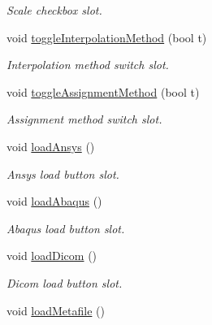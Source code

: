 \begin{DoxyCompactItemize}
\begin{DoxyCompactList}\small\item\em Scale checkbox slot. \item\end{DoxyCompactList}\item 
void \hyperlink{classgui_1_1_main_window_a9d49a35ea4419d69f2f89950a8ffbdda}{toggleInterpolationMethod} (bool t)
\begin{DoxyCompactList}\small\item\em Interpolation method switch slot. \item\end{DoxyCompactList}\item 
void \hyperlink{classgui_1_1_main_window_a3891bbf7215a4c190a6c5392dadb0a29}{toggleAssignmentMethod} (bool t)
\begin{DoxyCompactList}\small\item\em Assignment method switch slot. \item\end{DoxyCompactList}\item 
\hypertarget{classgui_1_1_main_window_ab527d189efca4163ee27ae1ffbf12f94}{
void \hyperlink{classgui_1_1_main_window_ab527d189efca4163ee27ae1ffbf12f94}{loadAnsys} ()}
\label{classgui_1_1_main_window_ab527d189efca4163ee27ae1ffbf12f94}

\begin{DoxyCompactList}\small\item\em Ansys load button slot. \item\end{DoxyCompactList}\item 
\hypertarget{classgui_1_1_main_window_ab146d4d7203ae93b9a50b9a1f0613b55}{
void \hyperlink{classgui_1_1_main_window_ab146d4d7203ae93b9a50b9a1f0613b55}{loadAbaqus} ()}
\label{classgui_1_1_main_window_ab146d4d7203ae93b9a50b9a1f0613b55}

\begin{DoxyCompactList}\small\item\em Abaqus load button slot. \item\end{DoxyCompactList}\item 
\hypertarget{classgui_1_1_main_window_a256bb2202375fc3309ae5543dc8ffc8f}{
void \hyperlink{classgui_1_1_main_window_a256bb2202375fc3309ae5543dc8ffc8f}{loadDicom} ()}
\label{classgui_1_1_main_window_a256bb2202375fc3309ae5543dc8ffc8f}

\begin{DoxyCompactList}\small\item\em Dicom load button slot. \item\end{DoxyCompactList}\item 
\hypertarget{classgui_1_1_main_window_a0ae17d7d51bd4549b37a6d07165203ca}{
void \hyperlink{classgui_1_1_main_window_a0ae17d7d51bd4549b37a6d07165203ca}{loadMetafile} ()}
\label{classgui_1_1_main_window_a0ae17d7d51bd4549b37a6d07165203ca}


\end{DoxyCompactItemize}
